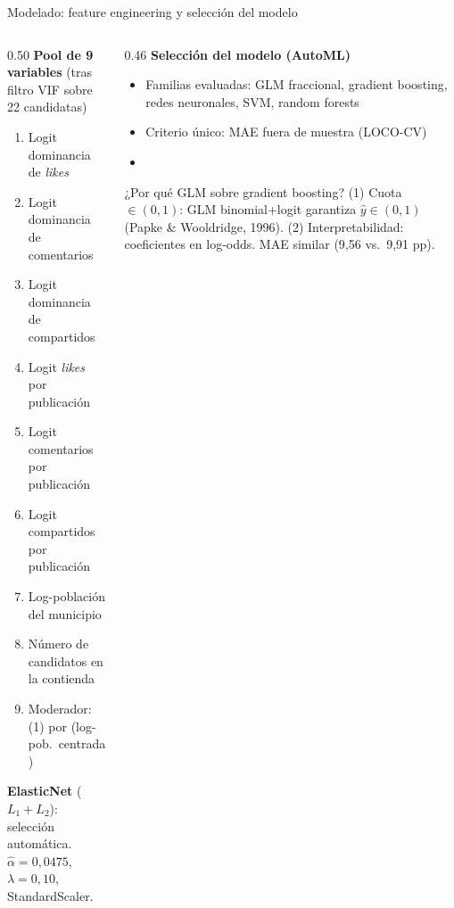 \begin{frame}{Modelado: feature engineering y selección del modelo}
  \begin{columns}[T]
    \begin{column}{0.50\textwidth}
      \textbf{Pool de 9 variables} (tras filtro VIF sobre 22 candidatas)
      \begin{enumerate}\small
        \item Logit dominancia de \textit{likes}
        \item Logit dominancia de comentarios
        \item Logit dominancia de compartidos
        \item Logit \textit{likes} por publicación
        \item Logit comentarios por publicación
        \item Logit compartidos por publicación
        \item Log-población del municipio
        \item Número de candidatos en la contienda
        \item Moderador: (1) por (log-pob.\ centrada)
      \end{enumerate}
      \vspace{0.2em}
      {\small\textbf{ElasticNet} ($L_1 + L_2$): selección automática.\\
      $\hat\alpha=0{,}0475$, $\lambda=0{,}10$, StandardScaler.}
    \end{column}
    \begin{column}{0.46\textwidth}
      \textbf{Selección del modelo (AutoML)}
      \begin{itemize}\small
        \item Familias evaluadas: GLM fraccional, gradient boosting, redes neuronales,
              SVM, random forests
        \item Criterio único: MAE fuera de muestra (LOCO-CV)
        \item {}
      \end{itemize}
      \vspace{0.3em}
      \begin{exampleblock}{¿Por qué GLM sobre gradient boosting?}
        \scriptsize (1) Cuota $\in(0,1)$: GLM binomial+logit garantiza $\hat{y}\in(0,1)$
        (Papke \& Wooldridge, 1996). (2) Interpretabilidad: coeficientes en log-odds.
        MAE similar (9,56 vs.\  9,91 pp).
      \end{exampleblock}
    \end{column}
  \end{columns}
\end{frame}

